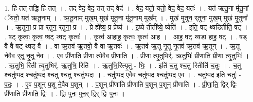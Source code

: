 \documentclass[17pt]{extarticle}
\begin{document}
1. हि तत् तद्धि हि तत् । . तद् वेद॒ वेद॒ तत् तद् वेद॑ । . वेद॒ यतो॒ यतो॒ वेद॒ वेद॒ यतः॑ । . यत॑ ऋतू॒ना मृ॑तू॒नां ॅयतो॒ यत॑ ऋतू॒नाम् । . ऋ॒तू॒नाम् मुख॒म् मुख॑ मृतू॒ना मृ॑तू॒नाम् मुख᳚म् । . मुख॑ मृ॒तुन॒ र्‌तुना॒ मुख॒म् मुख॑ मृ॒तुना᳚ । . ऋ॒तुना॒ प्र प्रा र्‌तुन॒ र्‌तुना॒ प्र । . प्रे ह्ये᳚ष्य॒ प्र प्रेष्य॑ । . इ॒ष्ये तीती᳚ष्ये॒ ष्येति॑ । . इति॒ षट् थ्षडितीति॒ षट् । . षट् कृत्वः॒ कृत्व॒ ष्षट् थ्षट् कृत्वः॑ । . कृत्व॑ आहाह॒ कृत्वः॒ कृत्व॑ आह । . आ॒ह॒ षट् थ्षडा॑ हाह॒ षट् । . षड् वै वै षट् थ्षड् वै । . वा ऋ॒तव॑ ऋ॒तवो॒ वै वा ऋ॒तवः॑ । . ऋ॒तव॑ ऋ॒तू नृ॒तू नृ॒तव॑ ऋ॒तव॑ ऋ॒तून् । . ऋ॒तू ने॒वैव र्‌तू नृ॒तू ने॒व । . ए॒व प्री॑णाति प्रीणा त्ये॒वैव प्री॑णाति । . प्री॒णा॒ त्यृ॒तुभिर्॑. ऋ॒तुभिः॑ प्रीणाति प्रीणा त्यृ॒तुभिः॑ । . ऋ॒तुभि॒ रिती त्यृ॒तुभिर्॑. ऋ॒तुभि॒ रिति॑ । . ऋ॒तुभि॒रित्यृ॒तु - भिः॒ । . इति॑ च॒तु श्च॒तु रितीति॑ च॒तुः । . च॒तु श्चतु॑ष्पद॒ श्चतु॑ष्पद श्च॒तु श्च॒तु श्चतु॑ष्पदः । . चतु॑ष्पद ए॒वैव चतु॑ष्पद॒ श्चतु॑ष्पद ए॒व । . चतु॑ष्पद॒ इति॒ चतुः॑ - प॒दः॒ । . ए॒व प॒शून् प॒शू ने॒वैव प॒शून् । . प॒शून् प्री॑णाति प्रीणाति प॒शून् प॒शून् प्री॑णाति । . प्री॒णा॒ति॒ द्विर् द्विः प्री॑णाति प्रीणाति॒ द्विः । . द्विः पुनः॒ पुन॒र् द्विर् द्विः पुनः॑ । \newline
\end{document}

